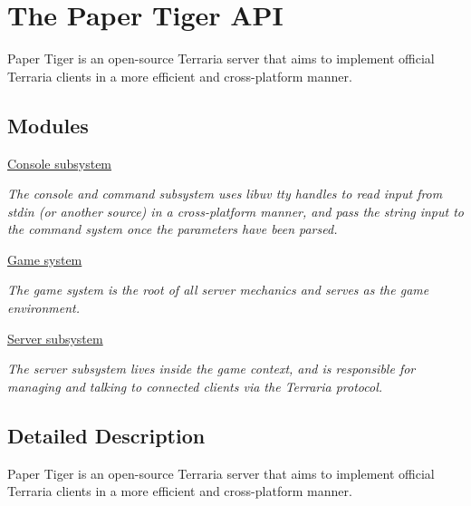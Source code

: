 \hypertarget{group__paper-tiger}{}\section{The Paper Tiger A\+P\+I}
\label{group__paper-tiger}


Paper Tiger is an open-\/source Terraria server that aims to implement official Terraria clients in a more efficient and cross-\/platform manner.  


\subsection*{Modules}
\begin{DoxyCompactItemize}
\item 
\hyperlink{group__console}{Console subsystem}
\begin{DoxyCompactList}\small\item\em The console and command subsystem uses libuv tty handles to read input from stdin (or another source) in a cross-\/platform manner, and pass the string input to the command system once the parameters have been parsed. \end{DoxyCompactList}\item 
\hyperlink{group__game}{Game system}
\begin{DoxyCompactList}\small\item\em The game system is the root of all server mechanics and serves as the game environment. \end{DoxyCompactList}\item 
\hyperlink{group__server}{Server subsystem}
\begin{DoxyCompactList}\small\item\em The server subsystem lives inside the {\ttfamily game} context, and is responsible for managing and talking to connected clients via the {\itshape Terraria} protocol. \end{DoxyCompactList}\end{DoxyCompactItemize}


\subsection{Detailed Description}
Paper Tiger is an open-\/source Terraria server that aims to implement official Terraria clients in a more efficient and cross-\/platform manner. 

